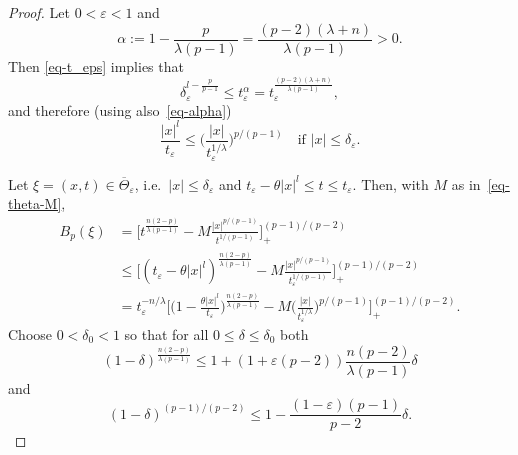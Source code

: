 \documentclass[10pt,a4paper]{amsart}
\newcommand{\al}{\alpha}
\newcommand{\de}{\delta}
\newcommand{\eps}{\varepsilon}
\newcommand{\la}{\lambda}
\begin{document}
\begin{proof}
Let $0 <\eps<1$ and 
\begin{equation}   \label{eq-alpha}
\al := 1-\frac{p}{\la(p-1)} = \frac{(p-2)(\la+n)}{\la (p-1)} >0.
\end{equation}
Then \eqref{eq-t_eps} implies that
\begin{equation}    \label{eq-t-eps-de-eps}
\de_\eps^{l-\frac{p}{p-1}}
\le t_\eps^\al =  t_\eps^{\frac{(p-2)(\la+n)}{\la(p-1)}},
\end{equation}
and therefore (using also~\eqref{eq-alpha})
\begin{equation}   \label{eq-choose-small-|x|}
\frac{|x|^l}{t_\eps} 
\le \biggl( \frac{|x|}{t_\eps^{1/\la}} \biggr)^{p/(p-1)}
\quad \text{if } |x| \le \de_\eps.
\end{equation}

Let $\xi=(x,t)\in \overline{\Theta}_\eps$, i.e.\ $|x| \le \de_\eps$
and $t_\eps-\theta |x|^l\le t \le t_\eps$. 
Then, with $M$ as in~\eqref{eq-theta-M},
\begin{align}
B_p(\xi) & =  \biggl[ t^{\frac{n(2-p)}{\la (p-1)}} - M
\frac{|x|^{p/(p-1)}}{t^{1/(p-1)}}\biggr]_{+}^{(p-1)/(p-2)}  \nonumber\\
& \le  \biggl[ (t_\eps - \theta|x|^l)^{\frac{n(2-p)}{\la (p-1)}} - 
M \frac{|x|^{p/(p-1)}}{t_\eps^{1/(p-1)}}   \biggr]_{+}^{(p-1)/(p-2)} \nonumber  \\
&= t_\eps^{-n/\la} \biggl[ \biggl(1-\frac{\theta |x|^l}{t_\eps}\biggr)^{\frac{n(2-p)}{\la (p-1)}} 
  - M \biggl( \frac{|x|}{t_\eps^{1/\la}} \biggr)^{p/(p-1)}\biggr]_{+}^{(p-1)/(p-2)}.
\label{eq-Bp1}
\end{align}
Choose $0<\de_0<1$ so that for all $0\le \de \le \de_0$ both
\begin{equation} \label{eq-1}
(1-\de)^{\frac{n(2-p)}{\la (p-1)}} \le 1+(1+\eps(p-2))
\frac{n(p-2)}{\la (p-1)} \de
\end{equation}
and 
\begin{equation} \label{eq-2} 
(1-\de)^{(p-1)/(p-2)} \le 1-\frac{(1-\eps)(p-1)}{p-2} \de.
\end{equation}


\end{proof}
\end{document}
